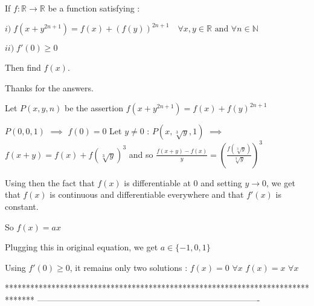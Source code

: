 


\begin{solution}
	\begin{tcolorbox}If $f:\mathbb{R} \to \mathbb{R}$ be a function satisfying :

$i)\; f(x+y^{2n+1})=f(x)+(f(y))^{2n+1} \quad \forall x,y \in \mathbb{R} \text{ and }  \forall n \in \mathbb{N}$

$ii)\; f'(0) \ge 0$

Then find $f(x)$.\end{tcolorbox}
Thanks for the answers.

Let $P(x,y,n)$ be the assertion $f(x+y^{2n+1})=f(x)+f(y)^{2n+1}$

$P(0,0,1)$ $\implies$ $f(0)=0$
Let $y\ne 0$ : $P(x,\sqrt[3]y,1)$ $\implies$ $f(x+y)=f(x)+f(\sqrt[3]y)^3$ and so $\frac{f(x+y)-f(x)}y=\left(\frac{f(\sqrt[3]y)}{\sqrt[3]y}\right)^3$

Using then the fact that $f(x)$ is differentiable at $0$ and setting $y\to 0$, we get that $f(x)$ is continuous and differentiable everywhere and that $f'(x)$ is constant.

So $f(x)=ax$

Plugging this in original equation, we get $a\in\{-1,0,1\}$

Using $f'(0)\ge 0$, it remains only two solutions :
$f(x)=0$ $\forall x$
$f(x)=x$ $\forall x$
\end{solution}
*******************************************************************************
-------------------------------------------------------------------------------

